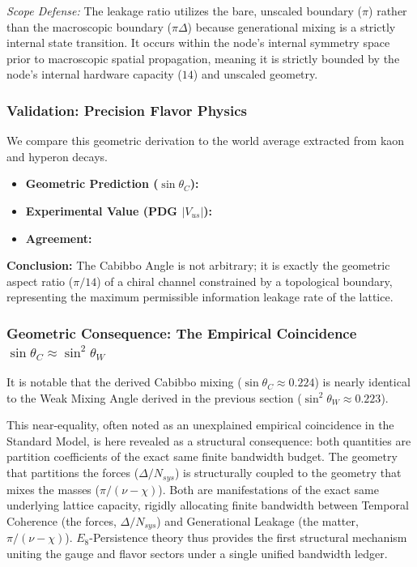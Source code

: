 \textit{Scope Defense:} The leakage ratio utilizes the bare, unscaled boundary ($\pi$) rather than the macroscopic boundary ($\pi\Delta$) because generational mixing is a strictly internal state transition. It occurs within the node's internal symmetry space prior to macroscopic spatial propagation, meaning it is strictly bounded by the node's internal hardware capacity ($14$) and unscaled geometry.

\subsubsection{Validation: Precision Flavor Physics}
We compare this geometric derivation to the world average extracted from kaon and hyperon decays.

\begin{itemize}
    \item \textbf{Geometric Prediction ($\sin \theta_C$):} \CabibboAngleVal
    \item \textbf{Experimental Value (PDG $|V_{us}|$):} \CabibboAngleExperimentalValue
    \item \textbf{Agreement:} \CabibboAngleAccText
\end{itemize}

\textbf{Conclusion:} The Cabibbo Angle is not arbitrary; it is exactly the geometric aspect ratio ($\pi/14$) of a chiral channel constrained by a topological boundary, representing the maximum permissible information leakage rate of the lattice.

\subsubsection{Geometric Consequence: The Empirical Coincidence \texorpdfstring{$\sin \theta_C \approx \sin^2 \theta_W$}{sin thetaC approx sin2 thetaW}}
It is notable that the derived Cabibbo mixing ($\sin \theta_C \approx 0.224$) is nearly identical to the Weak Mixing Angle derived in the previous section ($\sin^2 \theta_W \approx 0.223$). 

This near-equality, often noted as an unexplained empirical coincidence in the Standard Model, is here revealed as a structural consequence: both quantities are partition coefficients of the exact same finite bandwidth budget. The geometry that partitions the forces ($\Delta/N_{sys}$) is structurally coupled to the geometry that mixes the masses ($\pi/(\nu-\chi)$). Both are manifestations of the exact same underlying lattice capacity, rigidly allocating finite bandwidth between Temporal Coherence (the forces, $\Delta/N_{sys}$) and Generational Leakage (the matter, $\pi/(\nu-\chi)$). $E_8$-Persistence theory thus provides the first structural mechanism uniting the gauge and flavor sectors under a single unified bandwidth ledger.